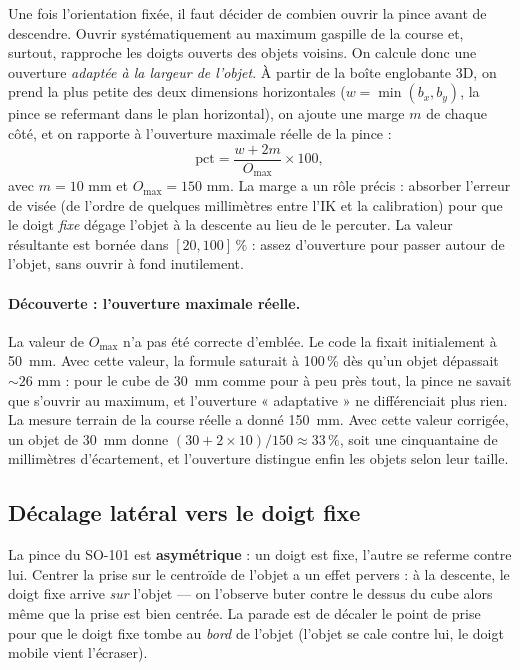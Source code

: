 Une fois l'orientation fixée, il faut décider de combien ouvrir la pince avant
de descendre. Ouvrir systématiquement au maximum gaspille de la course et,
surtout, rapproche les doigts ouverts des objets voisins. On calcule donc une
ouverture \emph{adaptée à la largeur de l'objet}. À partir de la boîte
englobante 3D, on prend la plus petite des deux dimensions horizontales
(\(w = \min(b_x, b_y)\), la pince se refermant dans le plan horizontal), on
ajoute une marge \(m\) de chaque côté, et on rapporte à l'ouverture maximale
réelle de la pince :
\begin{equation}
  \text{pct} = \frac{w + 2m}{O_{\max}} \times 100 ,
\end{equation}
avec \(m = 10\) mm et \(O_{\max} = 150\) mm. La marge a un rôle précis : absorber
l'erreur de visée (de l'ordre de quelques millimètres entre l'IK et la
calibration) pour que le doigt \emph{fixe} dégage l'objet à la descente au lieu
de le percuter. La valeur résultante est bornée dans \([20, 100]\,\%\) : assez
d'ouverture pour passer autour de l'objet, sans ouvrir à fond inutilement.

\paragraph{Découverte : l'ouverture maximale réelle.} La valeur de
\(O_{\max}\) n'a pas été correcte d'emblée. Le code la fixait initialement à
50~mm. Avec cette valeur, la formule saturait à 100\,\% dès qu'un objet dépassait
\(\sim\!26\) mm : pour le cube de 30~mm comme pour à peu près tout, la pince ne
savait que s'ouvrir au maximum, et l'ouverture « adaptative » ne différenciait
plus rien. La mesure terrain de la course réelle a donné 150~mm. Avec cette
valeur corrigée, un objet de 30~mm donne \((30 + 2\times10)/150 \approx 33\,\%\),
soit une cinquantaine de millimètres d'écartement, et l'ouverture distingue
enfin les objets selon leur taille.

\subsection{Décalage latéral vers le doigt fixe}
\label{sub:plan_lateral}

La pince du SO-101 est \textbf{asymétrique} : un doigt est fixe, l'autre se
referme contre lui. Centrer la prise sur le centroïde de l'objet a un effet
pervers : à la descente, le doigt fixe arrive \emph{sur} l'objet --- on l'observe
buter contre le dessus du cube alors même que la prise est bien centrée. La parade
est de décaler le point de prise pour que le doigt fixe tombe au \emph{bord} de
l'objet (l'objet se cale contre lui, le doigt mobile vient l'écraser).

